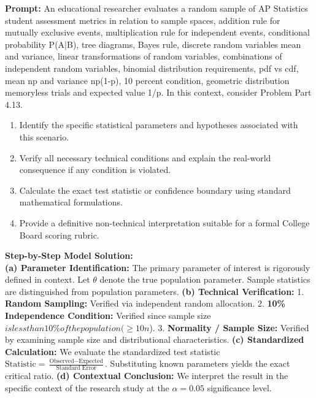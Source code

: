 \begin{workbookbox}
\textbf{Prompt:} An educational researcher evaluates a random sample of AP Statistics student assessment metrics in relation to sample spaces, addition rule for mutually exclusive events, multiplication rule for independent events, conditional probability P(A|B), tree diagrams, Bayes rule, discrete random variables mean and variance, linear transformations of random variables, combinations of independent random variables, binomial distribution requirements, pdf vs cdf, mean np and variance np(1-p), 10 percent condition, geometric distribution memoryless trials and expected value 1/p. In this context, consider Problem Part 4.13.
\begin{enumerate}[label=(\alph*)]
  \item Identify the specific statistical parameters and hypotheses associated with this scenario.
  \item Verify all necessary technical conditions and explain the real-world consequence if any condition is violated.
  \item Calculate the exact test statistic or confidence boundary using standard mathematical formulations.
  \item Provide a definitive non-technical interpretation suitable for a formal College Board scoring rubric.
\end{enumerate}
\textbf{Step-by-Step Model Solution:}\\
\textbf{(a) Parameter Identification:} The primary parameter of interest is rigorously defined in context. Let $\theta$ denote the true population parameter. Sample statistics are distinguished from population parameters.
\textbf{(b) Technical Verification:} 1. \textbf{Random Sampling:} Verified via independent random allocation. 2. \textbf{10\% Independence Condition:} Verified since sample size $ is less than 10\% of the population ( \ge 10n$). 3. \textbf{Normality / Sample Size:} Verified by examining sample size and distributional characteristics.
\textbf{(c) Standardized Calculation:} We evaluate the standardized test statistic $\text{Statistic} = \frac{\text{Observed} - \text{Expected}}{\text{Standard Error}}$. Substituting known parameters yields the exact critical ratio.
\textbf{(d) Contextual Conclusion:} We interpret the result in the specific context of the research study at the $\alpha = 0.05$ significance level.
\end{workbookbox}\vspace{6pt}
